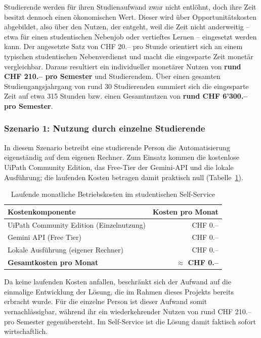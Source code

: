 \documentclass[11pt]{scrartcl}
\begin{document}
Studierende werden für ihren Studienaufwand zwar nicht entlöhnt, doch ihre Zeit besitzt dennoch einen ökonomischen Wert. Dieser wird über Opportunitätskosten abgebildet, also über den Nutzen, der entgeht, weil die Zeit nicht anderweitig -- etwa für einen studentischen Nebenjob oder vertieftes Lernen -- eingesetzt werden kann. Der angesetzte Satz von CHF 20.-- pro Stunde orientiert sich an einem typischen studentischen Nebenverdienst und macht die eingesparte Zeit monetär vergleichbar. Daraus resultiert ein individueller monetärer Nutzen von \textbf{rund CHF 210.-- pro Semester} und Studierendem. Über einen gesamten Studiengangsjahrgang von rund 30 Studierenden summiert sich die eingesparte Zeit auf etwa 315 Stunden bzw. einen Gesamtnutzen von \textbf{rund CHF 6'300.-- pro Semester}.

\subsubsection{Szenario 1: Nutzung durch einzelne Studierende}
In diesem Szenario betreibt eine studierende Person die Automatisierung eigenständig auf dem eigenen Rechner. Zum Einsatz kommen die kostenlose UiPath Community Edition, das Free-Tier der Gemini-API und die lokale Ausführung; die laufenden Kosten betragen damit praktisch null (Tabelle~\ref{tab:betriebskosten}).

\begin{table}[ht]
\centering
\caption{Laufende monatliche Betriebskosten im studentischen Self-Service}
\label{tab:betriebskosten}
\begin{tabularx}{\textwidth}{@{}Xr@{}}
\toprule
\textbf{Kostenkomponente} & \textbf{Kosten pro Monat} \\
\midrule
UiPath Community Edition (Einzelnutzung) & CHF 0.-- \\
Gemini API (Free Tier) & CHF 0.-- \\
Lokale Ausführung (eigener Rechner) & CHF 0.-- \\
\midrule
\textbf{Gesamtkosten pro Monat} & \textbf{$\approx$ CHF 0.--} \\
\bottomrule
\end{tabularx}
\end{table}

Da keine laufenden Kosten anfallen, beschränkt sich der Aufwand auf die einmalige Entwicklung der Lösung, die im Rahmen dieses Projekts bereits erbracht wurde. Für die einzelne Person ist dieser Aufwand somit vernachlässigbar, während ihr ein wiederkehrender Nutzen von rund CHF 210.-- pro Semester gegenübersteht. Im Self-Service ist die Lösung damit faktisch sofort wirtschaftlich.
\end{document}
